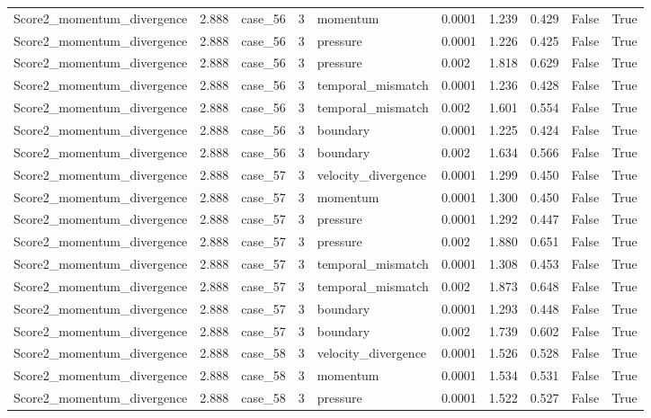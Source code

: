 \begin{longtable}{llllllllll}
Score2\_momentum\_divergence & 2.888 & case\_56 & 3 & momentum & 0.0001 & 1.239 & 0.429 & False & True \\
Score2\_momentum\_divergence & 2.888 & case\_56 & 3 & pressure & 0.0001 & 1.226 & 0.425 & False & True \\
Score2\_momentum\_divergence & 2.888 & case\_56 & 3 & pressure & 0.002 & 1.818 & 0.629 & False & True \\
Score2\_momentum\_divergence & 2.888 & case\_56 & 3 & temporal\_mismatch & 0.0001 & 1.236 & 0.428 & False & True \\
Score2\_momentum\_divergence & 2.888 & case\_56 & 3 & temporal\_mismatch & 0.002 & 1.601 & 0.554 & False & True \\
Score2\_momentum\_divergence & 2.888 & case\_56 & 3 & boundary & 0.0001 & 1.225 & 0.424 & False & True \\
Score2\_momentum\_divergence & 2.888 & case\_56 & 3 & boundary & 0.002 & 1.634 & 0.566 & False & True \\
Score2\_momentum\_divergence & 2.888 & case\_57 & 3 & velocity\_divergence & 0.0001 & 1.299 & 0.450 & False & True \\
Score2\_momentum\_divergence & 2.888 & case\_57 & 3 & momentum & 0.0001 & 1.300 & 0.450 & False & True \\
Score2\_momentum\_divergence & 2.888 & case\_57 & 3 & pressure & 0.0001 & 1.292 & 0.447 & False & True \\
Score2\_momentum\_divergence & 2.888 & case\_57 & 3 & pressure & 0.002 & 1.880 & 0.651 & False & True \\
Score2\_momentum\_divergence & 2.888 & case\_57 & 3 & temporal\_mismatch & 0.0001 & 1.308 & 0.453 & False & True \\
Score2\_momentum\_divergence & 2.888 & case\_57 & 3 & temporal\_mismatch & 0.002 & 1.873 & 0.648 & False & True \\
Score2\_momentum\_divergence & 2.888 & case\_57 & 3 & boundary & 0.0001 & 1.293 & 0.448 & False & True \\
Score2\_momentum\_divergence & 2.888 & case\_57 & 3 & boundary & 0.002 & 1.739 & 0.602 & False & True \\
Score2\_momentum\_divergence & 2.888 & case\_58 & 3 & velocity\_divergence & 0.0001 & 1.526 & 0.528 & False & True \\
Score2\_momentum\_divergence & 2.888 & case\_58 & 3 & momentum & 0.0001 & 1.534 & 0.531 & False & True \\
Score2\_momentum\_divergence & 2.888 & case\_58 & 3 & pressure & 0.0001 & 1.522 & 0.527 & False & True \\

\end{longtable}
